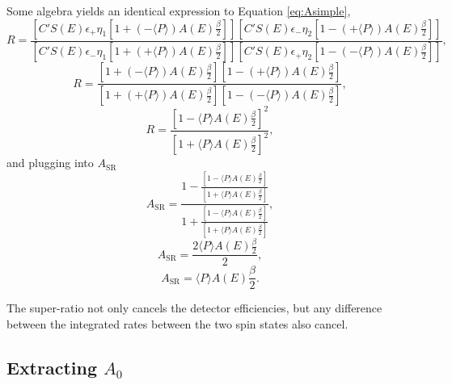 Some algebra yields an identical expression to Equation \ref{eq:Asimple},
%
\begin{equation*}
R = \frac{ \left[ C'  S(E)  \epsilon_{+}  \eta_{1} \left[ 1 + 
      \left(- \langle P \rangle \right)  A(E) \frac{\beta}{2} \right] \right] 
\left[ C'  S(E)  \epsilon_{-}  \eta_{2} \left[ 1 - 
    \left(+ \langle P \rangle \right)  A(E) \frac{\beta}{2} \right] \right] }
{ \left[ C'  S(E)  \epsilon_{-}  \eta_{1} \left[ 1 + 
      \left(+ \langle P \rangle \right)  A(E) \frac{\beta}{2} \right] \right] 
\left[ C'  S(E)  \epsilon_{+}  \eta_{2} \left[ 1 - 
    \left(- \langle P \rangle \right)  A(E) \frac{\beta}{2} \right] \right] },
\end{equation*}
%
\begin{equation*}
R = \frac{ \left[ 1 + \left(- \langle P \rangle \right)  A(E) \frac{\beta}{2} \right] 
\left[ 1 - \left(+ \langle P \rangle \right)  A(E) \frac{\beta}{2} \right]  }
{  \left[ 1 +  \left(+ \langle P \rangle \right)  A(E) \frac{\beta}{2}  \right] 
 \left[ 1 -  \left(- \langle P \rangle \right)  A(E) \frac{\beta}{2} \right]},
\end{equation*}
%
\begin{equation*}
R = \frac{ \left[ 1 -  \langle P \rangle  A(E) \frac{\beta}{2} \right]^2 }
{  \left[ 1 + \langle P \rangle  A(E) \frac{\beta}{2}  \right]^2 },
\end{equation*}
%
\noindent and plugging into $A_{\mathrm{SR}}$
%
\begin{equation*}
  A_{\mathrm{SR}} = \frac{1-\frac{ \left[ 1 -  \langle P \rangle  A(E) \frac{\beta}{2} \right] }
{  \left[ 1 + \langle P \rangle  A(E) \frac{\beta}{2}  \right] } }
  {1+\frac{ \left[ 1 -  \langle P \rangle  A(E) \frac{\beta}{2} \right] }
{  \left[ 1 + \langle P \rangle  A(E) \frac{\beta}{2}  \right] }},
\end{equation*}
%
\begin{equation*}
A_{\mathrm{SR}} = \frac{2 \langle P \rangle A(E) \frac{\beta}{2}}{2},
\end{equation*}
%
\begin{equation} \label{eq:A_SR}
A_{\mathrm{SR}} = \langle P \rangle A(E) \frac{\beta}{2}.
\end{equation}

The super-ratio not only cancels the detector efficiencies, but any difference between the
integrated rates between the two spin states also cancel.

\subsection{Extracting $A_0$}

